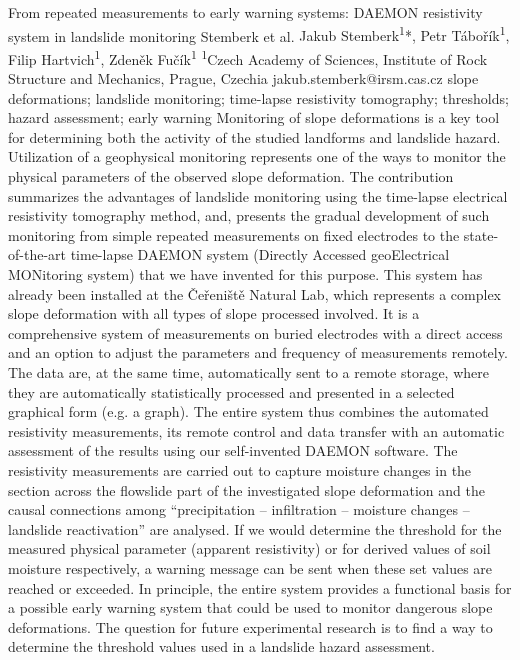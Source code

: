 \abstract
{From repeated measurements to early warning systems: DAEMON resistivity system in landslide monitoring} 
{Stemberk et al.} 
{Jakub Stemberk\textsuperscript{1}*, Petr Tábořík\textsuperscript{1}, Filip Hartvich\textsuperscript{1}, Zdeněk Fučík\textsuperscript{1}} 
{\POtag} 
{
\textsuperscript{1}Czech Academy of Sciences, Institute of Rock Structure and Mechanics, Prague, Czechia
}
{jakub.stemberk@irsm.cas.cz}  %
{slope deformations; landslide monitoring; time-lapse resistivity tomography; thresholds; hazard assessment; early warning}
{Monitoring of slope deformations is a key tool for determining both the activity of the studied landforms and landslide hazard. Utilization of a geophysical monitoring represents one of the ways to monitor the physical parameters of the observed slope deformation. The contribution summarizes the advantages of landslide monitoring using the time-lapse electrical resistivity tomography method, and, presents the gradual development of such monitoring from simple repeated measurements on fixed electrodes to the state-of-the-art time-lapse DAEMON system (Directly Accessed geoElectrical MONitoring system) that we have invented for this purpose. This system has already been installed at the Čeřeniště Natural Lab, which represents a complex slope deformation with all types of slope processed involved. It is a comprehensive system of measurements on buried electrodes with a direct access and an option to adjust the parameters and frequency of measurements remotely. The data are, at the same time, automatically sent to a remote storage, where they are automatically statistically processed and presented in a selected graphical form (e.g. a graph). The entire system thus combines the automated resistivity measurements, its remote control and data transfer with an automatic assessment of the results using our self-invented DAEMON software. The resistivity measurements are carried out to capture moisture changes in the section across the flowslide part of the investigated slope deformation and the causal connections among \enquote{precipitation – infiltration – moisture changes – landslide reactivation} are analysed. If we would determine the threshold for the measured physical parameter (apparent resistivity) or for derived values of soil moisture respectively, a warning message can be sent when these set values are reached or exceeded. In principle, the entire system provides a functional basis for a possible early warning system that could be used to monitor dangerous slope deformations. The question for future experimental research is to find a way to determine the threshold values used in a landslide hazard assessment.
}
